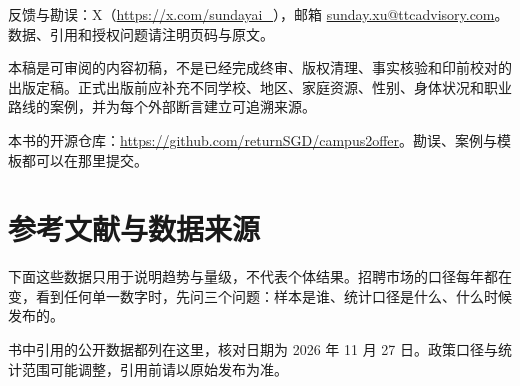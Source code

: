 \documentclass[UTF8,zihao=5,openany]{ctexbook}
\begin{document}
{\sloppy 反馈与勘误：X（\url{https://x.com/sundayai_}），邮箱 \url{sunday.xu@ttcadvisory.com}。数据、引用和授权问题请注明页码与原文。\par}

\begin{warningbox}
本稿是可审阅的内容初稿，不是已经完成终审、版权清理、事实核验和印前校对的出版定稿。正式出版前应补充不同学校、地区、家庭资源、性别、身体状况和职业路线的案例，并为每个外部断言建立可追溯来源。
\end{warningbox}

本书的开源仓库：\url{https://github.com/returnSGD/campus2offer}。勘误、案例与模板都可以在那里提交。

\chapter{参考文献与数据来源}

\begin{warningbox}
下面这些数据只用于说明趋势与量级，不代表个体结果。招聘市场的口径每年都在变，看到任何单一数字时，先问三个问题：样本是谁、统计口径是什么、什么时候发布的。
\end{warningbox}

书中引用的公开数据都列在这里，核对日期为 2026 年 11 月 27 日。政策口径与统计范围可能调整，引用前请以原始发布为准。
\end{document}
